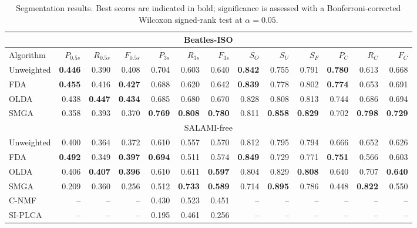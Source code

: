 \begin{table*}
\centering
\caption{Segmentation results. Best scores are indicated in bold; significance is assessed with a Bonferroni-corrected Wilcoxon
signed-rank test at $\alpha=0.05$.\label{tab:results}}
\footnotesize
\begin{tabular}{lrrrrrrrrrrrr}
\multicolumn{13}{c}{Beatles-ISO}\\
\toprule%
Algorithm   &   $P_{0.5s}$ & $R_{0.5s}$ & $F_{0.5s}$ & $P_{3s}$     & $R_{3s}$  & $F_{3s}$   & $S_O$ & $S_U$ & $S_F$ & $P_C$& $R_C$& $F_C$\\
\hline
Unweighted  &   \textbf{0.446} & 0.390 & 0.408 & 0.704   & 0.603 & 0.640 & \textbf{0.842} & 0.755 & 0.791 & \textbf{0.780} & 0.613 & 0.668\\
FDA         &   \textbf{0.455} & 0.416 & \textbf{0.427} & 0.688 & 0.620 & 0.642 & \textbf{0.839} & 0.778 & 0.802 & \textbf{0.774} & 0.653 & 0.691\\
OLDA        &   0.438 & \textbf{0.447} & \textbf{0.434} & 0.685   & 0.680 & 0.670 & 0.828 & 0.808 & 0.813 & 0.744 & 0.686 & 0.694\\
\hline
SMGA~\hfill\cite{serra2012unsupervised}
            &   0.358 & 0.393 & 0.370 & \textbf{0.769}   & \textbf{0.808} & \textbf{0.780} & 0.811 & \textbf{0.858} & \textbf{0.829} & 0.702 & \textbf{0.798} &
            \textbf{0.729}\\
\toprule%
\multicolumn{13}{c}{SALAMI-free}\\
\toprule%
Unweighted  & 0.400 & 0.364 & 0.372 & 0.610 & 0.557 & 0.570 & 0.812 & 0.795 & 0.794 & 0.666 & 0.652 & 0.626\\
FDA     &  \textbf{0.492} & 0.349 & \textbf{0.397} & \textbf{0.694} & 0.511 & 0.574 & \textbf{0.849} & 0.729 & 0.771 &
\textbf{0.751} & 0.566 & 0.603\\
OLDA    &  0.406 & \textbf{0.407} & \textbf{0.396} & 0.610 & 0.611 & \textbf{0.597} & 0.804 & 0.829 & \textbf{0.808} & 0.640 & 0.707 & \textbf{0.640}\\
\hline
SMGA~\hfill\cite{serra2012unsupervised}
        & 0.209 & 0.360 & 0.256 & 0.512 & \textbf{0.733} & \textbf{0.589} & 0.714 & \textbf{0.895} & 0.786 & 0.448 & \textbf{0.822} & 0.550\\
C-NMF~\hfill\cite{nieto2013convex}            
        & -- & -- & -- & 0.430 & 0.523 & 0.451 & -- & -- & -- & -- & -- & -- \\
SI-PLCA~\hfill\cite{weiss2011unsupervised}    
        & -- & -- & -- & 0.195 & 0.461 & 0.256 & -- & -- & -- & -- & -- & -- \\  
\bottomrule%
\end{tabular}
\end{table*}
